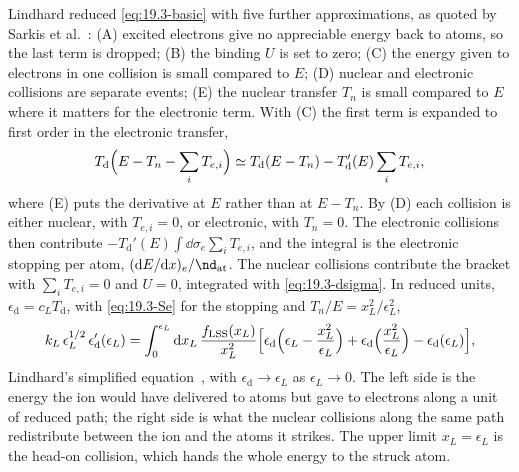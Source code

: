 Lindhard reduced \cref{eq:19.3-basic} with five further approximations, as quoted by Sarkis et al.~\cite[Sect.~II]{sarkis2020study}: (A) excited electrons give no appreciable energy back to atoms, so the last term is dropped; (B) the binding $U$ is set to zero; (C) the energy given to electrons in one collision is small compared to $E$; (D) nuclear and electronic collisions are separate events; (E) the nuclear transfer $T_n$ is small compared to $E$ where it matters for the electronic term. With (C) the first term is expanded to first order in the electronic transfer,
\begin{equation*}
  T_{\mathrm{d}}\Bigl(E - T_n - \sum_iT_{e,i}\Bigr) \simeq T_{\mathrm{d}}(E - T_n) - T_{\mathrm{d}}'(E)\sum_iT_{e,i} ,
\end{equation*}
where (E) puts the derivative at $E$ rather than at $E - T_n$. By (D) each collision is either nuclear, with $T_{e,i} = 0$, or electronic, with $T_n = 0$. The electronic collisions then contribute $-T_{\mathrm{d}}'(E)\int\dd\sigma_e\sum_iT_{e,i}$, and the integral is the electronic stopping per atom, $(\dd E/\dd x)_e/\nd_{\mathrm{at}}$. The nuclear collisions contribute the bracket with $\sum_iT_{e,i} = 0$ and $U = 0$, integrated with \cref{eq:19.3-dsigma}. In reduced units, $\epsilon_{\mathrm{d}} = c_LT_{\mathrm{d}}$, with \cref{eq:19.3-Se} for the stopping and $T_n/E = x_L^2/\epsilon_L^2$,
\begin{equation}
  k_L\,\epsilon_L^{1/2}\,\epsilon_{\mathrm{d}}'(\epsilon_L) = \int_0^{\epsilon_L}\mathrm{d} x_L\,\frac{f_{\mathrm{LSS}}(x_L)}{x_L^2}\Bigl[\epsilon_{\mathrm{d}}\Bigl(\epsilon_L - \frac{x_L^2}{\epsilon_L}\Bigr) + \epsilon_{\mathrm{d}}\Bigl(\frac{x_L^2}{\epsilon_L}\Bigr) - \epsilon_{\mathrm{d}}(\epsilon_L)\Bigr] ,
  \label{eq:19.3-simple}
\end{equation}
Lindhard's simplified equation~\cite[Eq.~(5)]{sarkis2020study}, with $\epsilon_{\mathrm{d}} \to \epsilon_L$ as $\epsilon_L \to 0$. The left side is the energy the ion would have delivered to atoms but gave to electrons along a unit of reduced path; the right side is what the nuclear collisions along the same path redistribute between the ion and the atoms it strikes. The upper limit $x_L = \epsilon_L$ is the head-on collision, which hands the whole energy to the struck atom.

